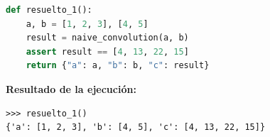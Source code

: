 \begin{lstlisting}[language=Python,caption={Ejercicio resuelto 1: convolución directa}]
def resuelto_1():
    a, b = [1, 2, 3], [4, 5]
    result = naive_convolution(a, b)
    assert result == [4, 13, 22, 15]
    return {"a": a, "b": b, "c": result}
\end{lstlisting}
\noindent\textbf{Resultado de la ejecución:}
\begin{lstlisting}[style=consolestyle]
>>> resuelto_1()
{'a': [1, 2, 3], 'b': [4, 5], 'c': [4, 13, 22, 15]}
\end{lstlisting}

